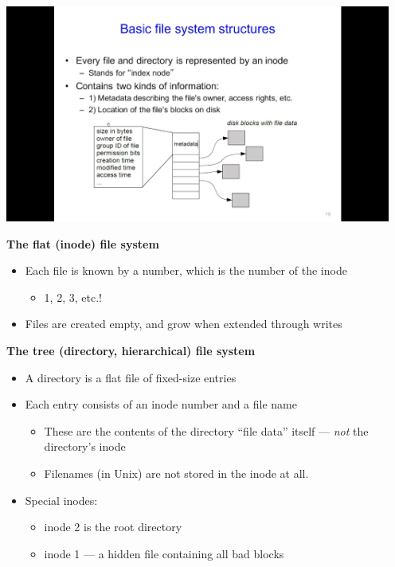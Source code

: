 \documentclass[11pt,a4paper]{article}
\begin{document}
\includegraphics[height=270]{basic-file-system-structures.jpg}

\textbf{The flat (inode) file system}
\begin{itemize}
    \item Each file is known by a number, which is the number of the inode
        \begin{itemize}
            \item 1, 2, 3, etc.!
        \end{itemize}
    \item Files are created empty, and grow when extended through writes
\end{itemize}

\textbf{The tree (directory, hierarchical) file system}
\begin{itemize}
    \item A directory is a flat file of fixed-size entries
    \item Each entry consists of an inode number and a file name
        \begin{itemize}
            \item These are the contents of the directory ``file data'' itself ---
                \emph{not} the directory's inode
            \item Filenames (in Unix) are not stored in the inode at all.
        \end{itemize}
    \item Special inodes:
        \begin{itemize}
            \item inode 2 is the root directory
            \item inode 1 --- a hidden file containing all bad blocks
        \end{itemize}
\end{itemize}
\end{document}
